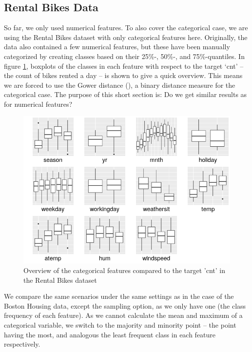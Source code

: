 \documentclass[
]{krantz}
\begin{document}
\hypertarget{rental-bikes-data}{%
\subsection{Rental Bikes Data}\label{rental-bikes-data}}

So far, we only used numerical features.
To also cover the categorical case, we are using the Rental Bikes dataset with only categorical features here.
Originally, the data also contained a few numerical features, but these have been manually categorized by creating classes based on their 25\%-, 50\%-, and 75\%-quantiles.
In figure \ref{fig:figbike}, boxplots of the classes in each feature with respect to the target `cnt' -- the count of bikes rented a day -- is shown to give a quick overview.
This means we are forced to use the Gower distance (\citet{gower1971general}), a binary distance measure for the categorical case.
The purpose of this short section is: Do we get similar results as for numerical features?

\begin{figure}

{\centering \includegraphics[width=9.72in]{images/bikes_prezi} 

}

\caption{Overview of the categorical features compared to the target 'cnt' in the Rental Bikes dataset}\label{fig:figbike}
\end{figure}

We compare the same scenarios under the same settings as in the case of the Boston Housing data, except the sampling option, as we only have one (the class frequency of each feature).
As we cannot calculate the mean and maximum of a categorical variable, we switch to the majority and minority point -- the point having the most, and analogous the least frequent class in each feature respectively.
\end{document}
